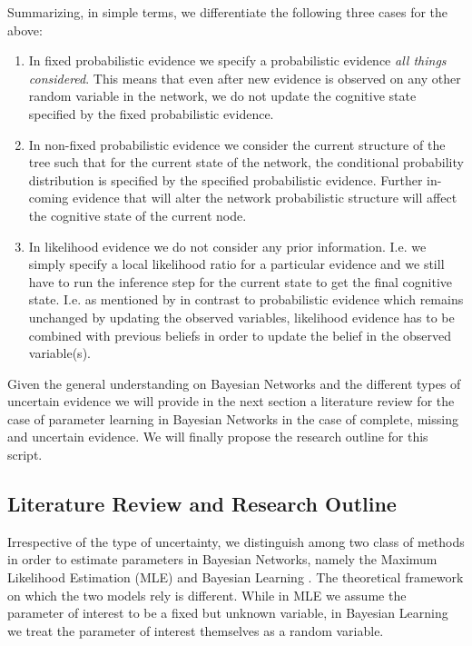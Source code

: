 \documentclass[11pt]{article}
\begin{document}
\begin{article}
Summarizing, in simple terms, we differentiate the following three
cases for the above:

\begin{enumerate}
\item In fixed probabilistic evidence we specify a probabilistic evidence \emph{all things
considered}. This means that even after new evidence is observed
on any other random variable in the network, we do not update the
cognitive state specified by the fixed probabilistic evidence.

\item In non-fixed probabilistic evidence we consider the current
structure of the tree such that for the current state of the
network, the conditional probability distribution is specified by
the specified probabilistic evidence. Further in-coming evidence
that will alter the network probabilistic structure will affect
the cognitive state of the current node.

\item In likelihood evidence we do not consider any prior
information. I.e. we simply specify a local likelihood ratio for
a particular evidence and we still have to run the inference step
for the current state to get the final cognitive state. I.e. as
mentioned by \cite{Mrad_2015} in contrast to probabilistic evidence
which remains unchanged by updating the observed variables,
likelihood evidence has to be combined with previous beliefs in
order to update the belief in the observed variable(s).
\end{enumerate}

Given the general understanding on Bayesian Networks and the
different types of uncertain evidence we will provide in the next
section a literature review for the case of parameter learning in
Bayesian Networks in the case of complete, missing and uncertain
evidence. We will finally propose the research outline for this
script. 

\subsection{Literature Review and Research Outline}
\label{literature_review}
Irrespective of the type of uncertainty, we distinguish among two
class of methods in order to estimate parameters in Bayesian
Networks, namely the Maximum Likelihood Estimation (MLE)
\cite{spiegelhalter1990sequential} and Bayesian Learning
\cite{Smith_2001}. The theoretical framework on which the two models
rely is different. While in MLE we assume the parameter of
interest to be a fixed but unknown variable, in Bayesian Learning
we treat the parameter of interest themselves as a random
variable.


\end{article}
\end{document}
